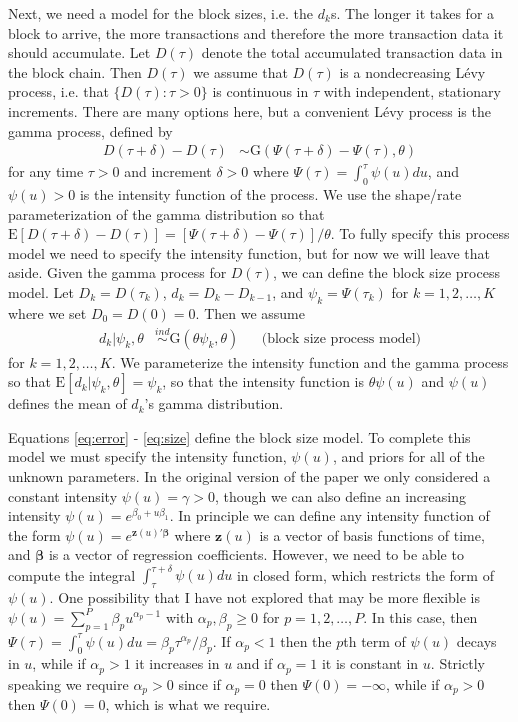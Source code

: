 \documentclass[12pt]{article}
\begin{document}
Next, we need a model for the block sizes, i.e. the $d_k$s. The longer it takes for a block to arrive, the more transactions and therefore the more transaction data it should accumulate. Let $D(\tau)$ denote the total accumulated transaction data in the block chain. Then $D(\tau)$ we assume that $D(\tau)$ is a nondecreasing L\'{e}vy process, i.e. that $\{D(\tau): \tau > 0\}$ is continuous in $\tau$ with independent, stationary increments. There are many options here, but a convenient L\'{e}vy process is the gamma process, defined by
\begin{align*}
D(\tau + \delta) - D(\tau) &\sim \mathrm{G}(\Psi(\tau + \delta) - \Psi(\tau), \theta)
\end{align*}
for any time $\tau>0$ and increment $\delta > 0$ where $\Psi(\tau) = \int_0^\tau\psi(u)du$, and $\psi(u)>0$ is the intensity function of the  process. We use the shape/rate parameterization of the gamma distribution so that $\mathrm{E}[D(\tau + \delta) - D(\tau)] = [\Psi(\tau + \delta) - \Psi(\tau)]/\theta$. To fully specify this process model we need to specify the intensity function, but for now we will leave that aside. Given the gamma process for $D(\tau)$, we can define the block size process model. Let $D_k = D(\tau_k)$, $d_k = D_k - D_{k-1}$, and $\psi_k = \Psi(\tau_k)$ for $k=1,2,\dots,K$ where we set $D_0 = D(0) = 0$. Then we assume
\begin{align}
d_k | \psi_k, \theta &\stackrel{ind}{\sim}\mathrm{G}(\theta\psi_k, \theta) && \mbox{(block size process model)}\label{eq:size}
\end{align}
for $k=1,2,\dots,K$. We parameterize the intensity function and the gamma process so that $\mathrm{E}[d_k|\psi_k,\theta] = \psi_k$, so that the intensity function is $\theta\psi(u)$ and $\psi(u)$ defines the mean of $d_k$'s gamma distribution.

Equations \eqref{eq:error} - \eqref{eq:size} define the block size model. To complete this model we must specify the intensity function, $\psi(u)$, and priors for all of the unknown parameters. In the original version of the paper we only considered a constant intensity $\psi(u) = \gamma > 0$, though we can also define an increasing intensity $\psi(u) = e^{\beta_0 + u\beta_1}$. In principle we can define any intensity function of the form $\psi(u) = e^{\bm{z}(u)'\bm{\beta}}$ where $\bm{z}(u)$ is a vector of basis functions of time, and $\bm{\beta}$ is a vector of regression coefficients. However, we need to be able to compute the integral $\int_{\tau}^{\tau + \delta}\psi(u)du$ in closed form, which restricts the form of $\psi(u)$. One possibility that I have not explored that may be more flexible is $\psi(u) = \sum_{p=1}^P\beta_pu^{\alpha_p - 1}$ with $\alpha_p, \beta_p\geq 0$ for $p=1,2,\dots,P$. In this case, then $\Psi(\tau) = \int_0^\tau\psi(u)du = \beta_p\tau^{\alpha_p}/\beta_p$. If $\alpha_p < 1$ then the $p$th term of $\psi(u)$ decays in $u$, while if $\alpha_p > 1$ it increases in $u$ and if $\alpha_p = 1$ it is constant in $u$. Strictly speaking we require $\alpha_p > 0$ since if $\alpha_p = 0$ then $\Psi(0) = -\infty$, while if $\alpha_p > 0$ then $\Psi(0) = 0$, which is what we require.
\end{document}
